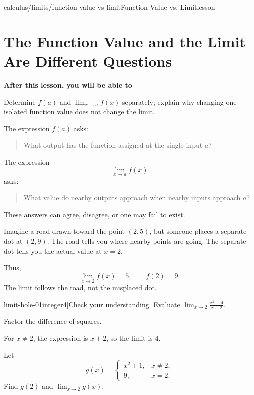 \documentclass[11pt,openany]{book}
\theoremstyle{bgplain}
\newcounter{bgexample}[chapter]
\newcounter{bgcheck}[section]
\newcommand{\lessonobjective}[1]{%
  \par\Needspace{4\baselineskip}\addvspace{0.6em}%
  {\bfseries\color{BGInk}After this lesson, you will be able to}\par\smallskip
  #1\par\addvspace{0.5em}%
}
\begin{document}
\begin{webpage}{calculus/limits/function-value-vs-limit}{Function Value vs. Limit}{lesson}
\section{The Function Value and the Limit Are Different Questions}

\lessonobjective{
Determine \(f(a)\) and \(\lim_{x\to a}f(x)\) separately; explain why changing one isolated function value does not change the limit.
}

The expression \(f(a)\) asks:

\begin{quote}
What output has the function assigned at the single input \(a\)?
\end{quote}

The expression
\[
  \lim_{x\to a}f(x)
\]
asks:

\begin{quote}
What value do nearby outputs approach when nearby inputs approach \(a\)?
\end{quote}

These answers can agree, disagree, or one may fail to exist.

\begin{bgguided}[title={The dot and the road}]
Imagine a road drawn toward the point \((2,5)\), but someone places a separate dot at \((2,9)\). The road tells you where nearby points are going. The separate dot tells you the actual value at \(x=2\).

Thus,
\[
  \lim_{x\to2}f(x)=5,
  \qquad
  f(2)=9.
\]
The limit follows the road, not the misplaced dot.
\end{bgguided}


\begin{bgcheck}{limit-hole-01}{integer}{4}[Check your understanding]
Evaluate \(\lim_{x\to2}\frac{x^2-4}{x-2}\).
\begin{bghint}
Factor the difference of squares.
\end{bghint}
\begin{bgreveal}
For \(x\ne2\), the expression is \(x+2\), so the limit is \(4\).
\end{bgreveal}
\end{bgcheck}



\begin{bgexample}[title={A piecewise value does not control the limit}]
Let
\[
  g(x)=
  \begin{cases}
    x^2+1,&x\ne2,\\
    9,&x=2.
  \end{cases}
\]
Find \(g(2)\) and \(\lim_{x\to2}g(x)\).


\end{bgexample}
\end{webpage}
\end{document}
